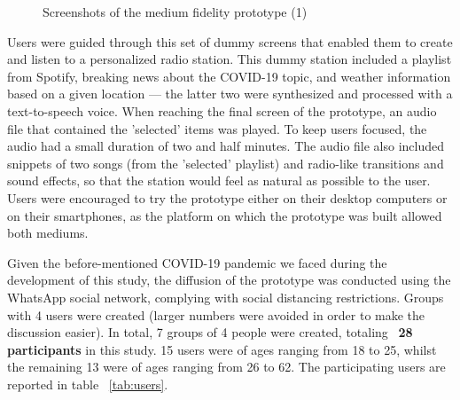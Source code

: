 {{\begin{figure}[htbp]
		 \qquad
	\caption{Screenshots of the medium fidelity prototype (1)}
	\label{fig:mfp11}
\end{figure}

Users were guided through this set of dummy screens that enabled them to create and listen to a personalized radio station. This dummy station included a playlist from Spotify, breaking news about the COVID-19 topic, and weather information based on a given location — the latter two were synthesized and processed with a text-to-speech voice. When reaching the final screen of the prototype, an audio file that contained the 'selected' items was played. To keep users focused, the audio had a small duration of two and half minutes. The audio file also included snippets of two songs (from the 'selected' playlist) and radio-like transitions and sound effects, so that the station would feel as natural as possible to the user. Users were encouraged to try the prototype either on their desktop computers or on their smartphones, as the platform on which the prototype was built allowed both mediums.

Given the before-mentioned COVID-19 pandemic we faced during the development of this study, the diffusion of the prototype was conducted using the WhatsApp social network, complying with social distancing restrictions. Groups with 4 users were created (larger numbers were avoided in order to make the discussion easier). In total, 7 groups of 4 people were created, totaling ~\textbf{28 participants} in this study. 15 users were of ages ranging from 18 to 25, whilst the remaining 13 were of ages ranging from 26 to 62. The participating users are reported in table ~\ref{tab:users}.

}}
